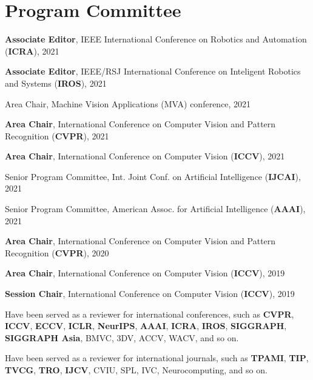 \documentclass[letterpaper,11pt]{article}
\newcommand{\resumeItem}[1]{
  \small{
  \item{#1 \vspace{-2pt}}
  }
}
\newcommand{\resumeItemListStart}{\begin{itemize}}
\newcommand{\resumeItemListEnd}{\end{itemize}\vspace{-5pt}}
\begin{document}
\section{Program Committee}
\resumeItemListStart
    \resumeItem{\textbf{Associate Editor}, IEEE International Conference on Robotics and Automation (\textbf{ICRA}),  2021}
    \resumeItem{\textbf{Associate Editor}, IEEE/RSJ International Conference on Inteligent Robotics and Systems (\textbf{IROS}),  2021}
    \resumeItem{Area Chair, Machine Vision Applications (MVA) conference,  2021}
    \resumeItem{\textbf{Area Chair}, International Conference on Computer Vision and Pattern Recognition (\textbf{CVPR}),  2021}
    \resumeItem{\textbf{Area Chair}, International Conference on Computer Vision (\textbf{ICCV}),  2021}
    \resumeItem{Senior Program Committee, Int. Joint Conf. on Artificial Intelligence (\textbf{IJCAI}),  2021}
    \resumeItem{Senior Program Committee, American Assoc. for Artificial Intelligence (\textbf{AAAI}),  2021}
    \resumeItem{\textbf{Area Chair}, International Conference on Computer Vision and Pattern Recognition (\textbf{CVPR}),  2020}
    \resumeItem{\textbf{Area Chair}, International Conference on Computer Vision (\textbf{ICCV}),  2019}
    \resumeItem{\textbf{Session Chair}, International Conference on Computer Vision (\textbf{ICCV}),  2019}
\resumeItem{Have been served as a reviewer for international conferences, such as \textbf{CVPR}, \textbf{ICCV}, \textbf{ECCV}, \textbf{ICLR}, \textbf{NeurIPS}, \textbf{AAAI}, \textbf{ICRA}, \textbf{IROS}, \textbf{SIGGRAPH}, \textbf{SIGGRAPH Asia}, BMVC, 3DV, ACCV, WACV, and so on.}
\resumeItem{Have been served as a reviewer for international journals, such as \textbf{TPAMI}, \textbf{TIP}, \textbf{TVCG}, \textbf{TRO}, \textbf{IJCV}, CVIU, SPL, IVC, Neurocomputing, and so on.}
\resumeItemListEnd
\end{document}
